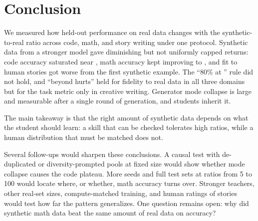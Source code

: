 \section{Conclusion}
\label{sec:conclusion}

We measured how held-out performance on real data changes with the synthetic-to-real ratio across code, math, and story writing under one protocol.
Synthetic data from a stronger model gave diminishing but not uniformly capped returns: code accuracy saturated near , math accuracy kept improving to , and fit to human stories got worse from the first synthetic example.
The ``80\% at '' rule did not hold, and ``beyond  hurts'' held for fidelity to real data in all three domains but for the task metric only in creative writing.
Generator mode collapse is large and measurable after a single round of generation, and students inherit it.

The main takeaway is that the right amount of synthetic data depends on what the student should learn: a skill that can be checked tolerates high ratios, while a human distribution that must be matched does not.

Several follow-ups would sharpen these conclusions.
A causal test with de-duplicated or diversity-prompted pools at fixed size would show whether mode collapse causes the code plateau.
More seeds and full test sets at ratios from 5 to 100 would locate where, or whether, math accuracy turns over.
Stronger teachers, other real-set sizes, compute-matched training, and human ratings of stories would test how far the pattern generalizes.
One question remains open: why did synthetic math data beat the same amount of real data on accuracy?
